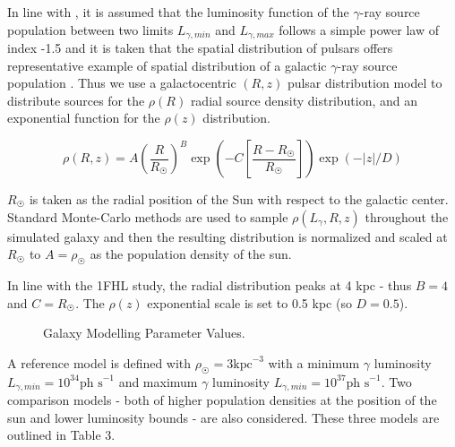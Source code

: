 \documentclass{PoS}
\begin{document}
In line with \cite{Strong}, it is assumed that the luminosity function of the $\gamma$-ray source population between two limits $L_{\gamma, min}$ and $L_{\gamma, max}$ follows a simple power law of index -1.5 and it is taken that the spatial distribution of pulsars offers representative example of spatial distribution of a galactic $\gamma$-ray source population \cite[p.2]{Strong}. Thus we use a galactocentric $(R, z)$ pulsar distribution model \cite[p.7]{Lorimer} to distribute sources for the $\rho(R)$ radial source density distribution, and an exponential function for the $\rho(z)$ distribution.

\begin{equation}
\rho(R, z) = A\left(\frac{R}{R_{\astrosun}}\right)^{B} \exp\left(-C\left[\frac{R-R_{\astrosun}}{R_{\astrosun}}\right]\right)\exp(-|z|/D)
\end{equation}

$R_{\astrosun}$ is taken as the radial position of the Sun with respect to the galactic center. Standard Monte-Carlo methods are used to sample $\rho(L_{\gamma}, R, z)$ throughout the simulated galaxy and then the resulting distribution is normalized and scaled at $R_{\astrosun}$ to $A = \rho_{\astrosun}$ as the population density of the sun.

In line with the 1FHL study, the radial distribution peaks at 4 kpc - thus $B = 4$ and $C = R_{\astrosun}$. The $\rho(z)$ exponential scale is set to 0.5 kpc (so $D=0.5$).

\begin{figure}
\centering
{}
\caption{Galaxy Modelling Parameter Values.}
\end{figure}

A reference model is defined with $\rho_{\astrosun} = 3 \text{kpc}^{-3}$ with a minimum $\gamma$ luminosity $L_{\gamma, min} = 10^{34} \text{ph s}^{-1}$ and maximum $\gamma$ luminosity $L_{\gamma, min} = 10^{37} \text{ph s}^{-1}$. Two comparison models - both of higher population densities at the position of the sun and lower luminosity bounds - are also considered. These three models are outlined in Table 3.
\end{document}
